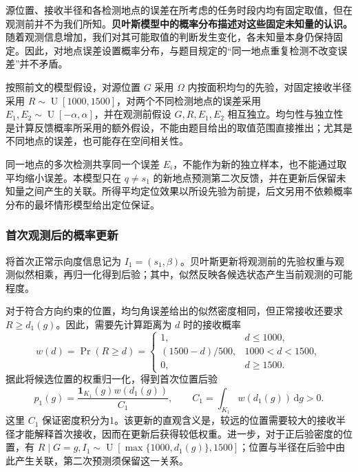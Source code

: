 \documentclass[UTF8,a4paper,zihao=-4,fontset=none]{ctexart}
\begin{document}
源位置、接收半径和各检测地点的误差在所考虑的任务时段内均有固定取值，但在观测前并不为我们所知。\textbf{贝叶斯模型中的概率分布描述对这些固定未知量的认识。} 随着观测信息增加，我们对其可能取值的判断发生变化，各未知量本身仍保持固定。因此，对地点误差设置概率分布，与题目规定的“同一地点重复检测不改变误差”并不矛盾。

按照前文的模型假设，对源位置 \(G\) 采用 \(\Omega\) 内按面积均匀的先验，对固定接收半径采用 \(R\sim\operatorname{U}[1000,1500]\)，对两个不同检测地点的误差采用 \(E_1,E_2\sim\operatorname{U}[-\alpha,\alpha]\)，并在观测前假设 \(G,R,E_1,E_2\) 相互独立。均匀性与独立性是计算反馈概率所采用的额外假设，不能由题目给出的取值范围直接推出；尤其是不同地点的误差，也可能存在空间相关性。

同一地点的多次检测共享同一个误差 \(E_i\)，不能作为新的独立样本，也不能通过取平均缩小误差。本模型只在 \(q\ne s_1\) 的新地点预测第二次反馈，并在更新后保留未知量之间产生的关联。所得平均定位效果以所设先验为前提，后文另用不依赖概率分布的最坏情形模型给出定位保证。

\subsubsection{首次观测后的概率更新}

将首次正常示向度信息记为 \(I_1=(s_1,\beta)\)。贝叶斯更新将观测前的先验权重与观测似然相乘，再归一化得到后验；其中，似然反映各候选状态产生当前观测的可能程度。

对于符合方向约束的位置，均匀角误差给出的似然密度相同，但正常接收还要求 \(R\ge d_1(g)\)。因此，需要先计算距离为 \(d\) 时的接收概率
\begin{equation}
 w(d)=\Pr(R\ge d)=
 \begin{cases}
 1,&d\le1000,\\
 (1500-d)/500,&1000<d<1500,\\
 0,&d\ge1500.
 \end{cases}
\label{eq:q2-pair-weight}
\end{equation}
据此将候选位置的权重归一化，得到首次位置后验
\begin{equation}
 p_1(g)=\frac{\mathbf1_{K_1}(g)w(d_1(g))}{C_1},
 \qquad C_1=\int_{K_1}w(d_1(g))\,\mathrm dg>0.
\label{eq:q2-pair-posterior}
\end{equation}
这里 \(C_1\) 保证密度积分为1。该更新的直观含义是，较远的位置需要较大的接收半径才能解释首次接收，因而在更新后获得较低权重。进一步，对于正后验密度的位置，有 \(R\mid G=g,I_1\sim\operatorname{U}[\max\{1000,d_1(g)\},1500]\)；位置与半径在后验中由此产生关联，第二次预测须保留这一关系。
\end{document}
